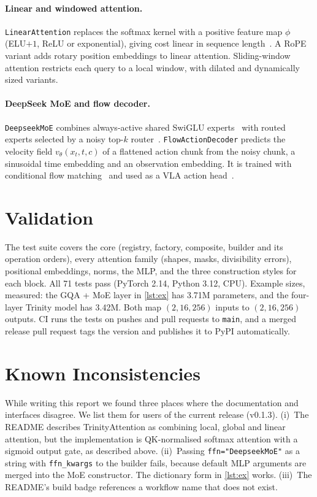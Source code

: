 \documentclass[11pt]{article}
\begin{document}
\paragraph{Linear and windowed attention.} \texttt{LinearAttention} replaces the softmax kernel with
a positive feature map $\phi$ (ELU$+1$, ReLU or exponential), giving cost linear in sequence
length~\cite{katharopoulos2020linear}. A RoPE variant adds rotary position embeddings to
linear attention. Sliding-window attention restricts each query to a local window, with dilated
and dynamically sized variants.

\paragraph{DeepSeek MoE and flow decoder.} \texttt{DeepseekMoE} combines always-active shared SwiGLU
experts~\cite{shazeer2020glu} with routed experts selected by a noisy top-$k$
router~\cite{shazeer2017outrageously,dai2024deepseekmoe}. \texttt{FlowActionDecoder} predicts the
velocity field $v_\theta(x_t,t,c)$ of a flattened action chunk from the noisy chunk, a
sinusoidal time embedding and an observation embedding. It is trained with conditional flow
matching~\cite{lipman2023flow} and used as a VLA action head~\cite{black2024pi0}.

\section{Validation}

The test suite covers the core (registry, factory, composite, builder and its operation
orders), every attention family (shapes, masks, divisibility errors), positional embeddings,
norms, the MLP, and the three construction styles for each block. All 71 tests pass (PyTorch
2.14, Python 3.12, CPU). Example sizes, measured: the GQA + MoE layer in \cref{lst:ex} has
3.71M parameters, and the four-layer Trinity model has 3.42M. Both map $(2,16,256)$ inputs
to $(2,16,256)$ outputs. CI runs the tests on pushes and pull requests to \texttt{main}, and a merged release pull request
tags the version and publishes it to PyPI automatically.

\section{Known Inconsistencies}

While writing this report we found three places where the documentation and interfaces
disagree. We list them for users of the current release (v0.1.3). (i)~The README describes
TrinityAttention as combining local, global and linear attention, but the implementation is
QK-normalised softmax attention with a sigmoid output gate, as described above.
(ii)~Passing \texttt{ffn="DeepseekMoE"} as a string with \texttt{ffn\_kwargs} to the builder fails,
because default MLP arguments are merged into the MoE constructor. The dictionary form in
\cref{lst:ex} works. (iii)~The README's build badge references a workflow name that does not
exist.
\end{document}

